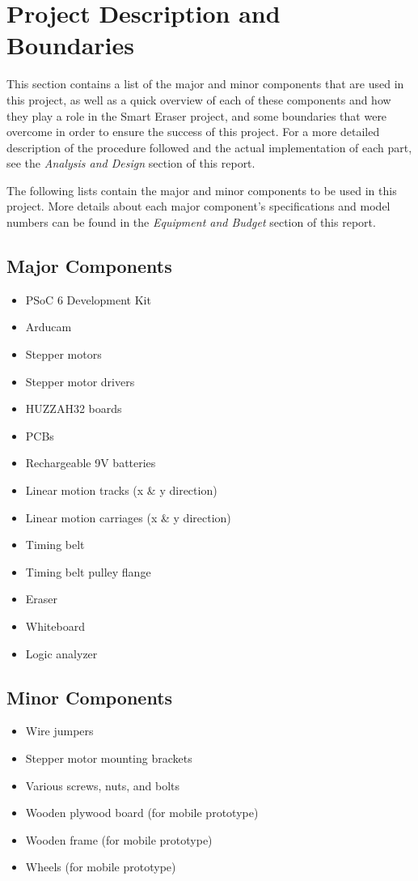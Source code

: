 \section{Project Description and Boundaries}
This section contains a list of the major and minor components that are used in this project, as well as a quick overview of each of these components and how they play a role in the Smart Eraser project, and some boundaries that were overcome in order to ensure the success of this project. For a more detailed description of the procedure followed and the actual implementation of each part, see the \textit{Analysis and Design} section of this report. \par
\setlength{\parindent}{2.5ex}The following lists contain the major and minor components to be used in this project. More details about each major component's specifications and model numbers can be found in the \textit{Equipment and Budget} section of this report.


\subsection{Major Components}
\begin{itemize}
	\item PSoC 6 Development Kit
	\item Arducam
	\item Stepper motors
	\item Stepper motor drivers
	\item HUZZAH32 boards
	\item PCBs
	\item Rechargeable 9V batteries
	\item Linear motion tracks (x \& y direction)
	\item Linear motion carriages (x \& y direction)
	\item Timing belt
	\item Timing belt pulley flange
	\item Eraser
	\item Whiteboard
	\item Logic analyzer
\end{itemize}

\subsection{Minor Components}
\begin{itemize}
	\item Wire jumpers
	\item Stepper motor mounting brackets
	\item Various screws, nuts, and bolts
	\item Wooden plywood board (for mobile prototype)
	\item Wooden frame (for mobile prototype)
	\item Wheels (for mobile prototype)
\end{itemize}

